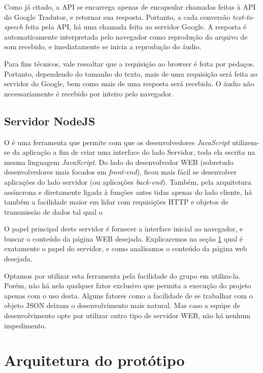 \documentclass[
	12pt,				%
	oneside,			%
	a4paper,			%
	english,			%
	brazil				%
	]{abntex2ppgsi}
\begin{document}
Como já citado, a API se encarrega apenas de encapsular chamadas feitas à API do Google Tradutor, e retornar sua resposta. Portanto, a cada conversão \textit{text-to-speech} feita pela API, há uma chamada  feita ao servidor Google. A resposta é automaticamente interpretada pelo navegador como reprodução do arquivo de som recebido, e imediatamente se inicia a reprodução do áudio. 

Para fins técnicos, vale ressaltar que a requisição ao browser é feita por pedaços. Portanto, dependendo do tamanho do texto, mais de uma requisição será feita ao servidor do Google, bem como mais de uma resposta será recebida. O áudio não necessariamente é recebido por inteiro pelo navegador. 

\subsection{Servidor NodeJS}

O  é uma ferramenta que permite com que os desenvolvedores \textit{JavaScript} utilizem-se da aplicação a fim de criar uma interface do lado Servidor, toda ela escrita na mesma linguagem \textit{JavaScript}. Do lado do desenvolvedor WEB (sobretudo desenvolvedores mais focados em \textit{front-end}), ficou mais fácil se desenvolver aplicações do lado servidor (ou aplicações \textit{back-end}). Também, pela arquitetura assíncrona e diretamente ligada à funções antes tidas apenas do lado cliente, há também a facilidade maior em lidar com requisições HTTP e objetos de transmissão de dados tal qual o 

O papel principal deste servidor é fornecer a interface inicial ao navegador, e buscar o conteúdo da página WEB desejada. Explicaremos na seção \ref{sec:arquitetura_prototipo} qual é exatamente o papel do servidor, e como analisamos o conteúdo da página web desejada. 

Optamos por utilizar esta ferramenta pela facilidade do grupo em utiliza-la. Porém, não há nela qualquer fator exclusivo que permita a execução do projeto apenas com o uso desta. Alguns fatores como a facilidade de se trabalhar com o objeto JSON deixam o desenvolvimento mais natural. Mas caso a equipe de desenvolvimento opte por utilizar outro tipo de servidor WEB, não há nenhum impedimento. 

\section{Arquitetura do protótipo} \label{sec:arquitetura_prototipo}
\end{document}
